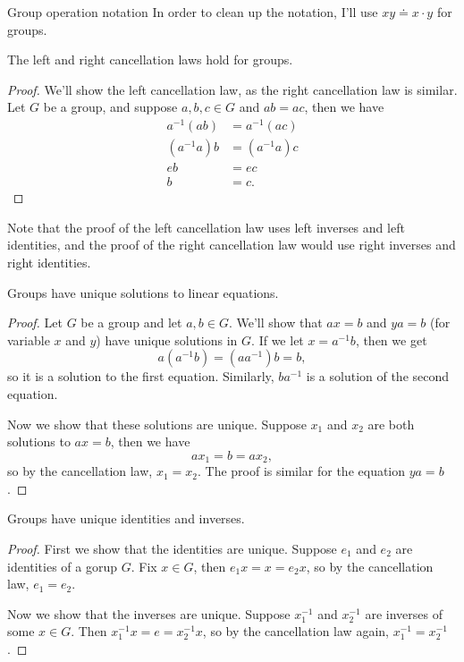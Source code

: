 \documentclass[10pt]{report}
\begin{document}
\begin{note}{Group operation notation}{}
In order to clean up the notation, I'll use $xy \doteq x \cdot y$ for groups.
\end{note}

\begin{prop}
	The left and right cancellation laws hold for groups.
\end{prop}
\begin{proof}
	We'll show the left cancellation law, as the right cancellation law is similar. Let $G$ be a group, and suppose $a,b,c \in G$ and $ab = ac$, then we have
\begin{align*}
	a^{-1} (ab) &= a^{-1} (ac) \\
	(a^{-1} a) b &= (a^{-1} a) c \\
	e b &= e c \\
	b &= c.
\end{align*}
\end{proof}

Note that the proof of the left cancellation law uses left inverses and left identities, and the proof of the right cancellation law would use right inverses and right identities.

\begin{prop}
	Groups have unique solutions to linear equations.
\end{prop}
\begin{proof}
	Let $G$ be a group and let $a,b \in G$. We'll show that $ax=b$ and $ya=b$ (for variable $x$ and $y$) have unique solutions in $G$. If we let $x = a^{-1}b$, then we get
	\[
		a (a^{-1}b) = (a a^{-1})b = b,
	\] so it is a solution to the first equation. Similarly, $b a^{-1}$ is a solution of the second equation.

	Now we show that these solutions are unique. Suppose $x_1$ and $x_2$ are both solutions to $ax=b$, then we have
	\[
	ax_1 = b = ax_2,
	\] so by the cancellation law, $x_1=x_2$. The proof is similar for the equation $ya=b$.
\end{proof}

\begin{prop}
	Groups have unique identities and inverses.
\end{prop}
\begin{proof}
	First we show that the identities are unique. Suppose $e_1$ and $e_2$ are identities of a gorup $G$. Fix $x \in G$, then $e_1 x = x = e_2 x$, so by the cancellation law, $e_1=e_2$.

	Now we show that the inverses are unique. Suppose $x_1^{-1}$ and $x_2^{-1}$ are inverses of some $x \in G$. Then $x_1^{-1}x=e=x_2^{-1}x$, so by the cancellation law again, $x_1^{-1}=x_2^{-1}$.
\end{proof}
\end{document}
